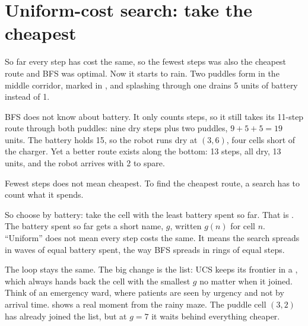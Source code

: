 \section{Uniform-cost search: take the cheapest}

So far every step has cost the same, so the fewest steps was also the cheapest route and BFS was optimal. Now it starts to rain. Two puddles form in the middle corridor, marked in , and splashing through one drains 5 units of battery instead of 1.

BFS does not know about battery. It only counts steps, so it still takes its 11-step route through both puddles: nine dry steps plus two puddles, $9+5+5=19$ units. The battery holds 15, so the robot runs dry at $(3,6)$, four cells short of the charger. Yet a better route exists along the bottom: 13 steps, all dry, 13 units, and the robot arrives with 2 to spare.

\begin{keyidea}
Fewest steps does not mean cheapest. To find the cheapest route, a search has to count what it spends.
\end{keyidea}

So choose by battery: take the cell with the least battery spent so far. That is . The battery spent so far gets a short name, $g$, written $g(n)$ for cell $n$. ``Uniform'' does not mean every step costs the same. It means the search spreads in waves of equal battery spent, the way BFS spreads in rings of equal steps.

The loop stays the same. The big change is the list: UCS keeps its frontier in a , which always hands back the cell with the smallest $g$ no matter when it joined. Think of an emergency ward, where patients are seen by urgency and not by arrival time.  shows a real moment from the rainy maze. The puddle cell $(3,2)$ has already joined the list, but at $g=7$ it waits behind everything cheaper.


